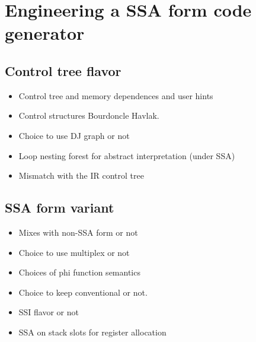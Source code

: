 \section{Engineering a SSA form code generator}
\label{sec:ssa-codegen-engineering}

%
%
%
%
%
%

\subsection{Control tree flavor}

\begin{itemize}

\item Control tree and memory dependences and user hints

\item Control structures Bourdoncle Havlak.

\item Choice to use DJ graph or not

\item Loop nesting forest for abstract interpretation (under SSA)

\item Mismatch with the IR control tree

\end{itemize}

\subsection{SSA form variant}

\begin{itemize}

\item Mixes with non-SSA form or not

\item Choice to use multiplex or not

\item Choices of phi function semantics

\item Choice to keep conventional or not.

\item SSI flavor or not

\item SSA on stack slots for register allocation

\end{itemize}

